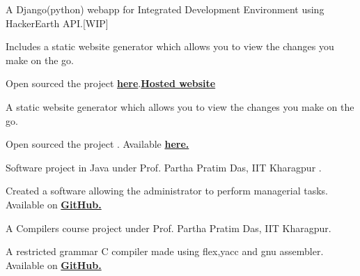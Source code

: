 \documentclass[a4paper]{deedy-resume} %
\begin{document}
\begin{minipage}[t]{0.66\textwidth}
  \sectionspace
  
  \runsubsection{}
  \begin{tightitemize}
  \item A Django(python) webapp for Integrated Development Environment using HackerEarth API.[WIP]
  \item Includes a static website generator which allows you to view the changes you make on the go.
  \item Open sourced the project \href{https://github.com/kaustubhhiware/c0derunR}{\bf here}.\href{http://c0derunr.pythonanywhere.com/}{\bf Hosted website}
  \end{tightitemize}

  \sectionspace

  \runsubsection{}
  \begin{tightitemize}
  \item A static website generator which allows you to view the changes you make on the go.
  \item Open sourced the project . Available \href{https://github.com/kaustubhhiware/Code.Play}{\bf here.}
  \end{tightitemize}

  \sectionspace
  
  \runsubsection{}
  \begin{tightitemize}
  \item Software project in Java under Prof. Partha Pratim Das, IIT Kharagpur .
  \item Created a software allowing the administrator to perform managerial tasks. Available on \href{https://github.com/kaustubhhiware/DepInfosys}{\bf GitHub.}
  \end{tightitemize}

  \sectionspace


  \runsubsection{}
  \begin{tightitemize}
  \item A Compilers course project under Prof. Partha Pratim Das, IIT Kharagpur.
  \item A restricted grammar C compiler made using flex,yacc and gnu assembler. Available on \href{https://github.com/kaustubhhiware/cOMPILER}{\bf GitHub.}
  \end{tightitemize}
 


\end{minipage}
\end{document}
